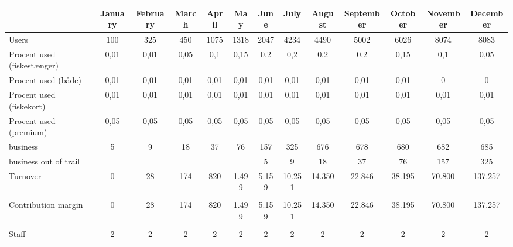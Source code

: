 \begin{tabularx}{\textwidth}{|X|c|c|c|c|c|c|c|c|c|c|c|c|}
\hline
\rowcolor[HTML]{C0C0C0} 
 & January & February & March & April & May & June & July & August & September & October & November & \multicolumn{1}{c|}{\cellcolor[HTML]{C0C0C0}December} \\ \hline\hline
\rowcolor[HTML]{C0C0C0} 
Users & 100 & 325 & 450 & 1075 & 1318 & 2047 & 4234 & 4490 & 5002 & 6026 & 8074 & \multicolumn{1}{c|}{\cellcolor[HTML]{C0C0C0}8083} \\ \hline
Procent used (fiskestænger) & 0,01 & 0,01 & 0,05 & 0,1 & 0,15 & 0,2 & 0,2 & 0,2 & 0,2 & 0,15 & 0,1 & \multicolumn{1}{c|}{0,05} \\ \hline
\rowcolor[HTML]{C0C0C0} 
Procent used (både) & 0,01 & 0,01 & 0,01 & 0,01 & 0,01 & 0,01 & 0,01 & 0,01 & 0,01 & 0,01 & 0 & \multicolumn{1}{c|}{\cellcolor[HTML]{C0C0C0}0} \\ \hline
Procent used (fiskekort) & 0,01 & 0,01 & 0,01 & 0,01 & 0,01 & 0,01 & 0,01 & 0,01 & 0,01 & 0,01 & 0,01 & \multicolumn{1}{c|}{0,01} \\ \hline
\rowcolor[HTML]{C0C0C0} 
Procent used (premium) & 0,05 & 0,05 & 0,05 & 0,05 & 0,05 & 0,05 & 0,05 & 0,05 & 0,05 & 0,05 & 0,05 & \multicolumn{1}{c|}{\cellcolor[HTML]{C0C0C0}0,05} \\ \hline
business & 5 & 9 & 18 & 37 & 76 & 157 & 325 & 676 & 678 & 680 & 682 & \multicolumn{1}{c|}{685} \\ \hline
\rowcolor[HTML]{C0C0C0} 
business out of trail &  &  &  &  &  & 5 & 9 & 18 & 37 & 76 & 157 & \multicolumn{1}{c|}{\cellcolor[HTML]{C0C0C0}325} \\ \hline
Turnover & 0 & 28 & 174 & 820 & 1.499 & 5.159 & 10.251 & 14.350 & 22.846 & 38.195 & 70.800 & \multicolumn{1}{c|}{137.257} \\ \hline\hline
\rowcolor[HTML]{C0C0C0} 
\multicolumn{13}{|l|}{\cellcolor[HTML]{C0C0C0}Variable costs} \\ \hline
Contribution margin & 0 & 28 & 174 & 820 & 1.499 & 5.159 & 10.251 & 14.350 & 22.846 & 38.195 & 70.800 & \multicolumn{1}{c|}{137.257} \\ \hline\hline
\rowcolor[HTML]{C0C0C0} 
\multicolumn{13}{|l|}{\cellcolor[HTML]{C0C0C0}Fixed cost} \\ \hline
Staff & 2 & 2 & 2 & 2 & 2 & 2 & 2 & 2 & 2 & 2 & 2 & \multicolumn{1}{c|}{2} \\ \hline

\end{tabularx}
